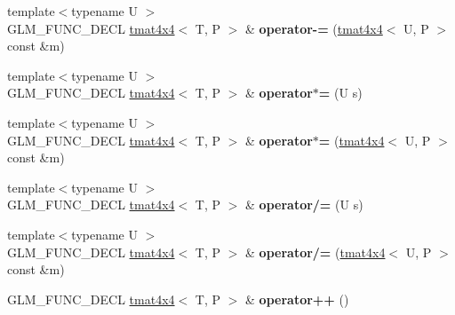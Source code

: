 \begin{DoxyCompactItemize}
\item 
\hypertarget{structglm_1_1tmat4x4_aa8385af8ad2d167f4111ab6346e4fd00}{{\footnotesize template$<$typename U $>$ }\\G\-L\-M\-\_\-\-F\-U\-N\-C\-\_\-\-D\-E\-C\-L \hyperlink{structglm_1_1tmat4x4}{tmat4x4}$<$ T, P $>$ \& {\bfseries operator-\/=} (\hyperlink{structglm_1_1tmat4x4}{tmat4x4}$<$ U, P $>$ const \&m)}\label{structglm_1_1tmat4x4_aa8385af8ad2d167f4111ab6346e4fd00}

\item 
\hypertarget{structglm_1_1tmat4x4_ab5bcd63a0b03e90c074dbca6e8c8eaea}{{\footnotesize template$<$typename U $>$ }\\G\-L\-M\-\_\-\-F\-U\-N\-C\-\_\-\-D\-E\-C\-L \hyperlink{structglm_1_1tmat4x4}{tmat4x4}$<$ T, P $>$ \& {\bfseries operator$\ast$=} (U s)}\label{structglm_1_1tmat4x4_ab5bcd63a0b03e90c074dbca6e8c8eaea}

\item 
\hypertarget{structglm_1_1tmat4x4_a5265dee9e6fd517e9d0ce28b006ad35b}{{\footnotesize template$<$typename U $>$ }\\G\-L\-M\-\_\-\-F\-U\-N\-C\-\_\-\-D\-E\-C\-L \hyperlink{structglm_1_1tmat4x4}{tmat4x4}$<$ T, P $>$ \& {\bfseries operator$\ast$=} (\hyperlink{structglm_1_1tmat4x4}{tmat4x4}$<$ U, P $>$ const \&m)}\label{structglm_1_1tmat4x4_a5265dee9e6fd517e9d0ce28b006ad35b}

\item 
\hypertarget{structglm_1_1tmat4x4_a1dff23012c9f5451ebaf7d96934f60cb}{{\footnotesize template$<$typename U $>$ }\\G\-L\-M\-\_\-\-F\-U\-N\-C\-\_\-\-D\-E\-C\-L \hyperlink{structglm_1_1tmat4x4}{tmat4x4}$<$ T, P $>$ \& {\bfseries operator/=} (U s)}\label{structglm_1_1tmat4x4_a1dff23012c9f5451ebaf7d96934f60cb}

\item 
\hypertarget{structglm_1_1tmat4x4_a0dc88dbbec27980b19dd322695bb2eab}{{\footnotesize template$<$typename U $>$ }\\G\-L\-M\-\_\-\-F\-U\-N\-C\-\_\-\-D\-E\-C\-L \hyperlink{structglm_1_1tmat4x4}{tmat4x4}$<$ T, P $>$ \& {\bfseries operator/=} (\hyperlink{structglm_1_1tmat4x4}{tmat4x4}$<$ U, P $>$ const \&m)}\label{structglm_1_1tmat4x4_a0dc88dbbec27980b19dd322695bb2eab}

\item 
\hypertarget{structglm_1_1tmat4x4_ade55e5ea2022831041d904bfde0fc7cc}{G\-L\-M\-\_\-\-F\-U\-N\-C\-\_\-\-D\-E\-C\-L \hyperlink{structglm_1_1tmat4x4}{tmat4x4}$<$ T, P $>$ \& {\bfseries operator++} ()}\label{structglm_1_1tmat4x4_ade55e5ea2022831041d904bfde0fc7cc}


\end{DoxyCompactItemize}
